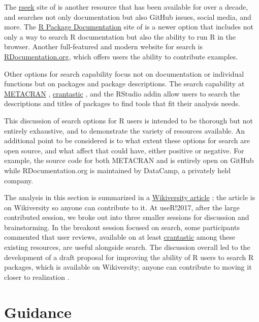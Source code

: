 The \href{https://rseek.org}{rseek} site of \citet{goodman} is another
resource that has been available for over a decade, and searches not
only documentation but also GitHub issues, social media, and more. The
\href{https://rdrr.io}{R Package Documentation} site of \citet{rdrrio}
is a newer option that includes not only a way to search R documentation
but also the ability to run R in the browser. Another full-featured and
modern website for search is
\href{https://www.rdocumentation.org/}{RDocumentation.org}, which offers
users the ability to contribute examples.

Other options for search capability focus not on documentation or
individual functions but on packages and package descriptions. The
search capability at \href{https://www.r-pkg.org/}{METACRAN}
\citep{metacran}, \href{http://www.crantastic.org/}{crantastic}
\citep{crantastic}, and the RStudio addin  allow
users to search the descriptions and titles of packages to find tools
that fit their analysis needs.

This discussion of search options for R users is intended to be thorough
but not entirely exhaustive, and to demonstrate the variety of resources
available. An additional point to be considered is to what extent these
options for search are open source, and what affect that could have,
either positive or negative. For example, the source code for both
METACRAN and  is entirely open on GitHub while
RDocumentation.org is maintained by DataCamp, a privately held company.

The analysis in this section is summarized in a
\href{https://en.wikiversity.org/wiki/Searching_R_Packages}{Wikiversity
article} \citep{wikiversity}; the article is on Wikiversity so anyone
can contribute to it. At useR!2017, after the large contributed session,
we broke out into three smaller sessions for discussion and
brainstorming. In the breakout session focused on search, some
participants commented that user reviews, available on at least
\href{http://www.crantastic.org/}{crantastic} among these existing
resources, are useful alongside search. The discussion overall led to
the development of a draft proposal for improving the ability of R users
to search R packages, which is available on Wikiversity; anyone can
contribute to moving it closer to realization \citep{draftProposal}.

\hypertarget{guidance}{%
\section{Guidance}\label{guidance}}

